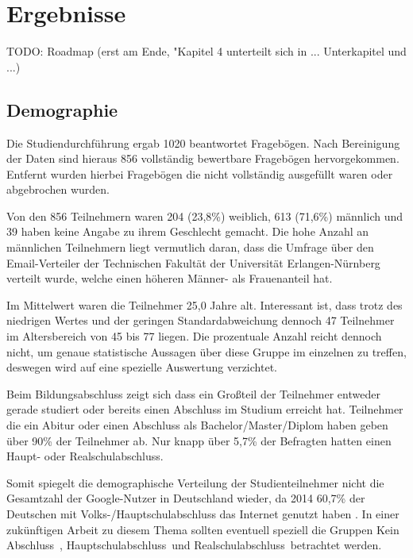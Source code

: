 %
% 

\chapter{Ergebnisse}

TODO: Roadmap (erst am Ende, "Kapitel 4 unterteilt sich in ... Unterkapitel und ...)

\section{Demographie}
\label{sec:demo}
Die Studiendurchführung ergab 1020 beantwortet Fragebögen. Nach Bereinigung der Daten sind hieraus 856 vollständig bewertbare Fragebögen hervorgekommen. Entfernt wurden hierbei Fragebögen die nicht vollständig ausgefüllt waren oder abgebrochen wurden.

Von den 856 Teilnehmern waren 204 (23,8\%) weiblich, 613 (71,6\%) männlich und 39 haben keine Angabe zu ihrem Geschlecht gemacht. Die hohe Anzahl an männlichen Teilnehmern liegt vermutlich daran, dass die Umfrage über den Email-Verteiler der Technischen Fakultät der Universität Erlangen-Nürnberg verteilt wurde, welche einen höheren Männer- als Frauenanteil hat.

Im Mittelwert waren die Teilnehmer 25,0 Jahre alt. Interessant ist, dass trotz des niedrigen Wertes und der geringen Standardabweichung dennoch 47 Teilnehmer im Altersbereich von 45 bis 77 liegen. Die prozentuale Anzahl reicht dennoch nicht, um genaue statistische Aussagen über diese Gruppe im einzelnen zu treffen, deswegen wird auf eine spezielle Auswertung verzichtet.

Beim Bildungsabschluss zeigt sich dass ein Großteil der Teilnehmer entweder gerade studiert oder bereits einen Abschluss im Studium erreicht hat. Teilnehmer die ein Abitur oder einen Abschluss als Bachelor/Master/Diplom haben geben über 90\% der Teilnehmer ab. Nur knapp über 5,7\% der Befragten hatten einen Haupt- oder Realschulabschluss.

Somit spiegelt die demographische Verteilung der Studienteilnehmer nicht die Gesamtzahl der Google-Nutzer in Deutschland wieder, da 2014 60,7\% der Deutschen mit Volks-/Hauptschulabschluss das Internet genutzt haben \cite{statistabildung}. In einer zukünftigen Arbeit zu diesem Thema sollten eventuell speziell die Gruppen \glqq Kein Abschluss\grqq\ , \glqq Hauptschulabschluss\grqq\ und \glqq Realschulabschluss\grqq\ betrachtet werden.

